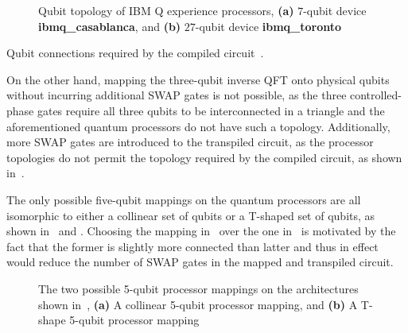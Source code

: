 \clearpage
\begin{figure}[t!]
    \caption[Qubit topology of IBM Q experience processors.]{Qubit topology of IBM Q experience processors, \textbf{(a)} $7$-qubit device \textbf{ibmq\_casablanca}, and \textbf{(b)} $27$-qubit device \textbf{ibmq\_toronto}}
\end{figure}


\begin{marginfigure}
    \centering
	\resizebox{.9\textwidth}{!} {
	}
    \caption[Qubit connections required by the compiled circuit.]{Qubit connections required by the compiled circuit~\protect{}.}
\end{marginfigure}

\noindent
On the other hand, mapping the three-qubit inverse \acs{QFT} onto physical qubits without incurring additional SWAP gates is not possible, as the three controlled-phase gates require all three qubits to be interconnected in a triangle and the aforementioned quantum processors do not have such a topology. Additionally, more SWAP gates are introduced to the transpiled circuit, as the processor topologies do not permit the topology required by the compiled circuit, as shown in~.


\bigskip
\noindent
The only possible five-qubit mappings on the quantum processors are all isomorphic to either a collinear set of qubits or a T-shaped set of qubits, as shown in~ and . Choosing the mapping in~ over the one in~ is motivated by the fact that the former is slightly more connected than latter and thus in effect would reduce the number of SWAP gates in the mapped and transpiled circuit.



\begin{figure}[hbt]
	\centering
	\begin{minipage}[hbt]{.47\textwidth}
	\end{minipage}
	\begin{minipage}[hbt]{.47\textwidth}
	\end{minipage}
    \caption[The two possible 5-qubit processor mappings on the architectures shown in~\protect{}.]{The two possible 5-qubit processor mappings on the architectures shown in~\protect{}, \textbf{(a)} A collinear 5-qubit processor mapping, and \textbf{(b)} A T-shape 5-qubit processor mapping}
\end{figure}



